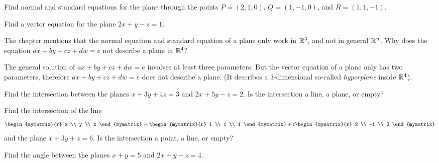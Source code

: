\begin{enumialphparenastyle}
\begin{ex}
  Find normal and standard equations for the plane through the points
  $P = (2,1,0)$, $Q=(1,-1,0)$, and $R=(1,1,-1)$.
\end{ex}

\begin{ex}
  Find a vector equation for the plane $2x+y-z=1$.
\end{ex}

\begin{ex}
  The chapter mentions that the normal equation and standard equation
  of a plane only work in $\mathbb{R}^3$, and not in general $\mathbb{R}^n$. Why does
  the equation $ax+by+cz+dw=e$ not describe a plane in $\mathbb{R}^4$?
  \begin{sol}
    The general solution of $ax+by+cz+dw=e$ involves at least three
    parameters.  But the vector equation of a plane only has two
    parameters, therefore $ax+by+cz+dw=e$ does not describe a
    plane. (It describes a 3-dimensional so-called {\em
      hyperplane} inside
    $\mathbb{R}^4$).
  \end{sol}
\end{ex}

\begin{ex}
  Find the intersection between the planes $x+3y+4z=3$ and $2x+5y-z=2$.
  Is the intersection a line, a plane, or empty?
\end{ex}

\begin{ex}
Find the intersection of the line
  \begin{equation*}
    \begin{mymatrix}{r} x \\ y \\ z \end{mymatrix}
    = \begin{mymatrix}{r} 1 \\ 1 \\ 1 \end{mymatrix}
    + t \begin{mymatrix}{r} 2 \\ -1 \\ 2 \end{mymatrix}
  \end{equation*}
  and the plane $x+3y+z = 6$.
  Is the intersection a point, a line, or empty?
\end{ex}

\begin{ex}
  Find the angle between the planes $x+y=5$ and $2x+y-z=4$.
\end{ex}


\end{enumialphparenastyle}
